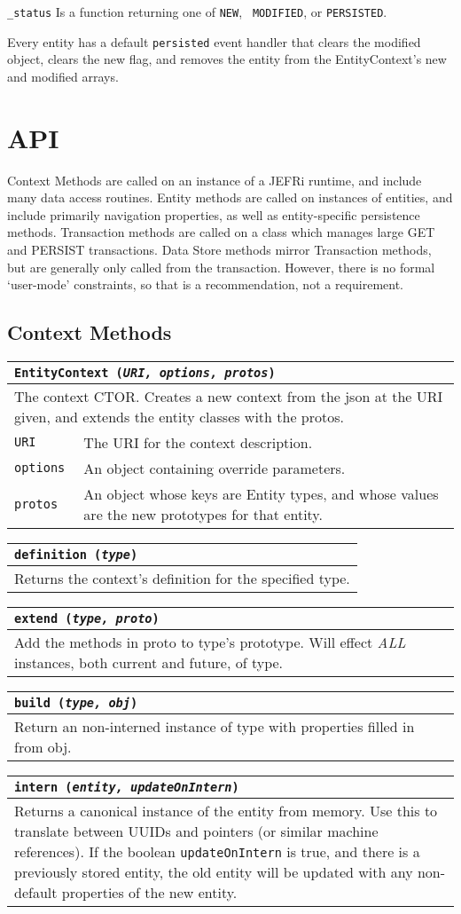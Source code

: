 \documentclass{article}
\newcommand{\ilcode}{\tt}
\newcommand{\method}[4]{
	\begin{tabular}{ | l | p{6in} | }
	\hline
	\multicolumn{2}{|l|}{\ilcode #1 ({\it #2})} \\
	\hline
	\multicolumn{2}{|p{7in}|}{#3} \\
	\hline
	#4
	\end{tabular}
}
\newcommand{\param}[2]{
	{\ilcode #1} & #2 \\
	\hline
}
\begin{document}
{\ilcode \_status} Is a function returning one of {\ilcode NEW}, {\ilcode
MODIFIED}, or {\ilcode PERSISTED}.

Every entity has a default {\ilcode persisted} event handler that clears the
modified object, clears the new flag, and removes the entity from the
EntityContext's new and modified arrays.

\section{API}
Context Methods are called on an instance of a JEFRi runtime, and include many
data access routines. Entity methods are called on instances of entities, and
include primarily navigation properties, as well as entity-specific persistence
methods. Transaction methods are called on a class which manages large GET and
PERSIST transactions. Data Store methods mirror Transaction methods, but
are generally only called from the transaction. However, there is no formal
`user-mode' constraints, so that is a recommendation, not a requirement.

\subsection{Context Methods}
	\method{EntityContext}{URI, options, protos}
	{The context CTOR. Creates a new context from the json at the URI given,
		and extends the entity classes with the protos.}
	{
		\param{URI}{The URI for the context description.}
		\param{options}{An object containing override parameters.}
		\param{protos}{An object whose keys are Entity types, and whose values
			are the new prototypes for that entity.}
	}

	\method{definition}{type}
	{Returns the context's definition for the specified type.}
	{}

	\method{extend}{type, proto}
		{Add the methods in proto to type's prototype. Will effect {\it ALL}
				instances, both current and future, of type.}{}

	\method{build}{type, obj}
		{Return an non-interned instance of type with properties filled in from
				obj.}{}

	\method{intern}{entity, updateOnIntern}
		{Returns a canonical instance of the entity from memory. Use this to
		translate between UUIDs and pointers (or similar machine references). If
		the boolean {\ilcode updateOnIntern} is true, and there is a previously
		stored entity, the old entity will be updated with any non-default
		properties of the new entity.}{}
\end{document}
